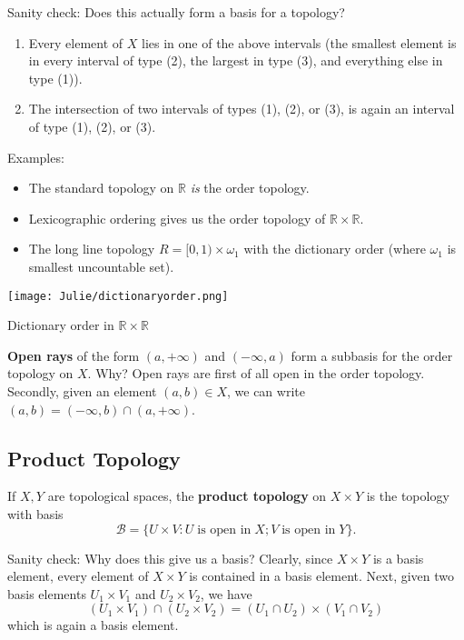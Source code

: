 \documentclass{article}
\newcommand{\nline}{\vspace*{0.5\baselineskip}}
\theoremstyle{definition}
\begin{document}
\begin{flushleft}
\nline

Sanity check: Does this actually form a basis for a topology?

\begin{enumerate}
    \item Every element of $X$ lies in one of the above intervals (the smallest element is in every interval of type (2), the largest in type (3), and everything else in type (1)).
    \item The intersection of two intervals of types (1), (2), or (3), is again an interval of type (1), (2), or (3).
\end{enumerate}

Examples:

\begin{itemize}
    \item The standard topology on $\mathbb{R}$ \textit{is} the order topology.
    \item Lexicographic ordering gives us the order topology of $\mathbb{R} \times \mathbb{R}$.
    \item The long line topology $R = [0, 1) \times \omega_1$ with the dictionary order (where $\omega_1$ is smallest uncountable set).
\end{itemize}

\begin{center}
    \texttt{[image: Julie/dictionaryorder.png]}

    \caption{Dictionary order in $\mathbb{R} \times \mathbb{R}$}
\end{center}

\textbf{Open rays} of the form $(a, +\infty)$ and $(-\infty, a)$ form a subbasis for the order topology on $X$. Why? Open rays are first of all open in the order topology. Secondly, given an element $(a,b) \in X$, we can write $(a,b) = (-\infty, b) \cap (a, +\infty)$.

\subsection{Product Topology}

If $X, Y$ are topological spaces, the \textbf{product topology} on $X \times Y$ is the topology with basis
\[
\mathcal{B} = \{ U \times V : U \; \text{is open in} \; X; V \; \text{is open in} \; Y \}.
\]

Sanity check: Why does this give us a basis? Clearly, since $X \times Y$ is a basis element, every element of $X \times Y$ is contained in a basis element. Next, given two basis elements $U_1 \times V_1$ and $U_2 \times V_2$, we have
\[
(U_1 \times V_1) \cap (U_2 \times V_2) = (U_1 \cap U_2) \times (V_1 \cap V_2)
\]
which is again a basis element.


\end{flushleft}
\end{document}
